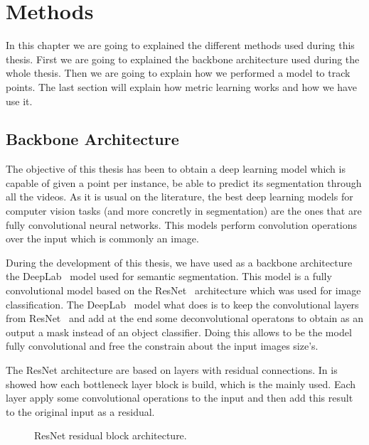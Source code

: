 
\chapter{Methods}
\label{cha:methods}

In this chapter we are going to explained the different methods used during this thesis.
First we are going to explained the backbone architecture used during the whole thesis.
Then we are going to explain how we performed a model to track points.
The last section will explain how metric learning works and how we have use it.

\section{Backbone Architecture}
\label{sec:methods_backbone_architecture}

The objective of this thesis has been to obtain a deep learning model which is capable of given a point per instance, be able to predict its segmentation through all the videos.
As it is usual on the literature, the best deep learning models for computer vision tasks (and more concretly in segmentation) are the ones that are fully convolutional neural networks.
This models perform convolution operations over the input which is commonly an image.

During the development of this thesis, we have used as a backbone architecture the DeepLab~\cite{chen2018deeplab} model used for semantic segmentation.
This model is a fully convolutional model based on the ResNet~\cite{he2016deep} architecture which was used for image classification.
The DeepLab~\cite{chen2018deeplab} model what does is to keep the convolutional layers from ResNet~\cite{he2016deep} and add at the end some deconvolutional operatons to obtain as an output a mask instead of an object classifier.
Doing this allows to be the model fully convolutional and free the constrain about the input images size's.

The ResNet architecture are based on layers with residual connections. In  is showed how each bottleneck layer block is build, which is the mainly used.
Each layer apply some convolutional operations to the input and then add this result to the original input as a residual.

\begin{figure}[h]
  \centering
  \caption{ResNet residual block architecture. }
  \label{fig:resnet_block}
\end{figure}

